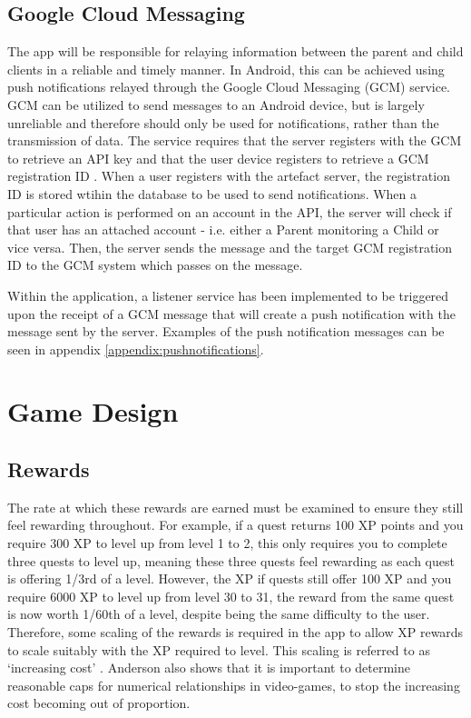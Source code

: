 \subsection{Google Cloud Messaging}
The app will be responsible for relaying information between the parent and child clients in a reliable and timely manner.
In Android, this can be achieved using push notifications relayed through the Google Cloud Messaging (GCM) service.
GCM can be utilized to send messages to an Android device, but is largely unreliable \citep{gcmreliability} and therefore should only be used for notifications, rather than the transmission of data.
The service requires that the server registers with the GCM to retrieve an API key and that the user device registers to retrieve a GCM registration ID \citep{gcm}. 
When a user registers with the artefact server, the registration ID is stored wtihin the database to be used to send notifications.
When a particular action is performed on an account in the API, the server will check if that user has an attached account - i.e. either a Parent monitoring a Child or vice versa.
Then, the server sends the message and the target GCM registration ID to the GCM system which passes on the message.

Within the application, a listener service has been implemented to be triggered upon the receipt of a GCM message that will create a push notification with the message sent by the server.
Examples of the push notification messages can be seen in appendix \ref{appendix:pushnotifications}.

\section{Game Design}
\subsection{Rewards}
The rate at which these rewards are earned must be examined to ensure they still feel rewarding throughout. 
For example, if a quest returns 100 XP points and you require 300 XP to level up from level 1 to 2, this only requires you to complete three quests to level up, meaning these three quests feel rewarding as each quest is offering 1/3rd of a level.
However, the XP if quests still offer 100 XP and you require 6000 XP to level up from level 30 to 31, the reward from the same quest is now worth 1/60th of a level, despite being the same difficulty to the user.
Therefore, some scaling of the rewards is required in the app to allow XP rewards to scale suitably with the XP required to level.
This scaling is referred to as `increasing cost' \citep{1_anderson_2016}.
Anderson also shows that it is important to determine reasonable caps for numerical relationships in video-games, to stop the increasing cost becoming out of proportion.


